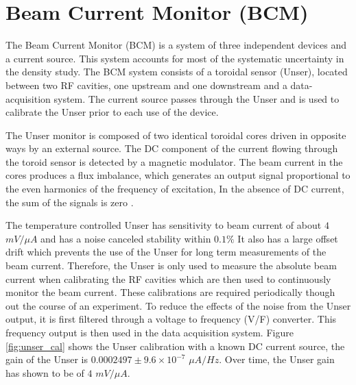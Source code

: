 \documentclass[final,5p,times,twocolumn]{elsarticle}
\begin{document}
\section{Beam Current Monitor (BCM)}
\label{BCM}

The Beam Current Monitor (BCM) is a system of three independent devices and a current source. This system accounts for most  of the systematic uncertainty in the density study. The BCM system consists of a toroidal sensor (Unser), located between two RF cavities, one upstream and one downstream and a data-acquisition system. The current source passes through the Unser and is used to calibrate the Unser prior to each use of the device. 

The Unser monitor is composed of two identical toroidal cores driven in opposite ways by an external source.  The DC component of the current flowing through the toroid sensor is detected by a magnetic modulator. The beam current in the cores produces a flux imbalance, which generates an output signal proportional to the even harmonics of the frequency of excitation, In the absence of DC current, the sum of the signals is zero \cite{denard}. 

The temperature controlled Unser has sensitivity to beam current of about $4$ $mV/\mu A$ and has a noise canceled stability within $0.1\%$ \cite{denard} It also has a large offset drift which prevents the use of the Unser for long term measurements of the beam current. Therefore, the Unser is only used to measure the absolute beam current when calibrating the RF cavities which are then used to continuously monitor the beam current. These calibrations are required periodically though out the course of an experiment. To reduce the effects of the noise from the Unser output, it is first filtered through a voltage to frequency (V/F) converter. This frequency output is then used in the data acquisition system. Figure \ref{fig:unser_cal} shows the Unser calibration with a known DC current source, the gain of the Unser is $0.0002497 \pm 9.6 \times 10^{-7} $ $\mu A/Hz$. Over time, the Unser gain has shown to be of $4$ $mV/\mu A$.
\end{document}

